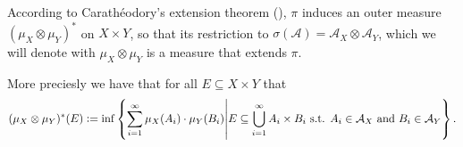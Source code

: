 \documentclass[11pt,a4paper]{article}
\newcommand{\A}{\mathcal A}
\begin{document}
According to Carath\'eodory's extension theorem
(),
$\pi$ induces an outer measure $(\mu_X \otimes \mu_Y)^*$ on $X \times Y$,
so that its restriction to $\sigma(\A) = \A_X \otimes \A_Y$,
which we will denote with $\mu_X \otimes \mu_Y$ is a measure that
extends $\pi$.

More preciesly we have that for all $E \subseteq X \times Y$ that
\[
  (\mu_X \otimes \mu_Y)^*(E) :=
  \inf\set{\sum_{i=1}^{\infty} \mu_X(A_i) \cdot \mu_Y(B_i) \middle\vert
  E \subseteq \bigcup_{i=1}^{\infty} A_i \times B_i \st
  A_i \in \A_X \stand B_i \in \A_Y}.
\]




\begin{definition}
\end{definition}
\end{document}
